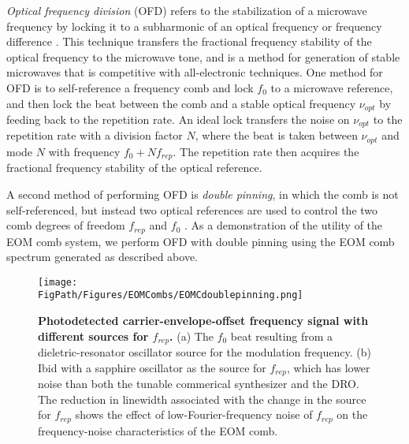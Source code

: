\textit{Optical frequency division} (OFD) refers to the stabilization of a microwave frequency by locking it to a subharmonic of an optical frequency or frequency difference \cite{McFerran2005,Fortier2011}. This technique transfers the fractional frequency stability of the optical frequency to the microwave tone, and is a method for generation of stable microwaves that is competitive with all-electronic techniques. One method for OFD is to self-reference a frequency comb and lock $f_0$ to a microwave reference, and then lock the beat between the comb and a stable optical frequency $\nu_{opt}$ by feeding back to the repetition rate. An ideal lock transfers the noise on $\nu_{opt}$ to the repetition rate with a division factor $N$, where the beat is taken between $\nu_{opt}$ and mode $N$ with frequency $f_0+Nf_{rep}$. The repetition rate then acquires the fractional frequency stability of the optical reference.

A second method of performing OFD is \textit{double pinning}, in which the comb is not self-referenced, but instead two optical references are used to control the two comb degrees of freedom $f_{rep}$ and $f_0$ \cite{Swann2011,Papp2014,Li2014b}. As a demonstration of the utility of the EOM comb system, we perform OFD with double pinning using the EOM comb spectrum generated as described above.

\begin{figure}[htpb]
	\begin{center}
		\texttt{[image: \\FigPath/Figures/EOMCombs/EOMCdoublepinning.png]}
	\end{center}
	\caption[Photodetected carrier-envelope-offset frequency signal with different sources for $f_{rep}$]{\textbf{Photodetected carrier-envelope-offset frequency signal with different sources for $f_{rep}$.} (a) The $f_0$ beat resulting from a dieletric-resonator oscillator source for the modulation frequency. (b) Ibid with a sapphire oscillator as the source for $f_{rep}$, which has lower noise than both the tunable commerical synthesizer and the DRO. The reduction in linewidth associated with the change in the source for $f_{rep}$ shows the effect of low-Fourier-frequency noise of $f_{rep}$ on the frequency-noise characteristics of the EOM comb. }
	\label{fig:EOMCdoublepinning}
\end{figure} 

